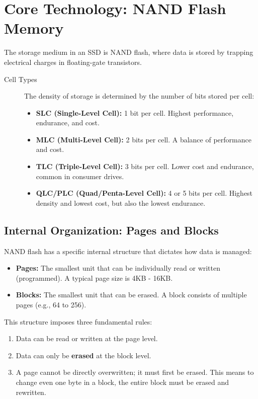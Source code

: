 \section{Core Technology: NAND Flash Memory}
The storage medium in an SSD is NAND flash, where data is stored by trapping electrical charges in floating-gate transistors.
\begin{description}
    \item[Cell Types] The density of storage is determined by the number of bits stored per cell:
    \begin{itemize}
        \item \textbf{SLC (Single-Level Cell):} 1 bit per cell. Highest performance, endurance, and cost.
        \item \textbf{MLC (Multi-Level Cell):} 2 bits per cell. A balance of performance and cost.
        \item \textbf{TLC (Triple-Level Cell):} 3 bits per cell. Lower cost and endurance, common in consumer drives.
        \item \textbf{QLC/PLC (Quad/Penta-Level Cell):} 4 or 5 bits per cell. Highest density and lowest cost, but also the lowest endurance.
    \end{itemize}
\end{description}

\subsection{Internal Organization: Pages and Blocks}
NAND flash has a specific internal structure that dictates how data is managed:
\begin{itemize}
    \item \textbf{Pages:} The smallest unit that can be individually read or written (programmed). A typical page size is 4KB - 16KB.
    \item \textbf{Blocks:} The smallest unit that can be erased. A block consists of multiple pages (e.g., 64 to 256).
\end{itemize}
This structure imposes three fundamental rules:
\begin{enumerate}
    \item Data can be read or written at the page level.
    \item Data can only be \textbf{erased} at the block level.
    \item A page cannot be directly overwritten; it must first be erased. This means to change even one byte in a block, the entire block must be erased and rewritten.
\end{enumerate}

